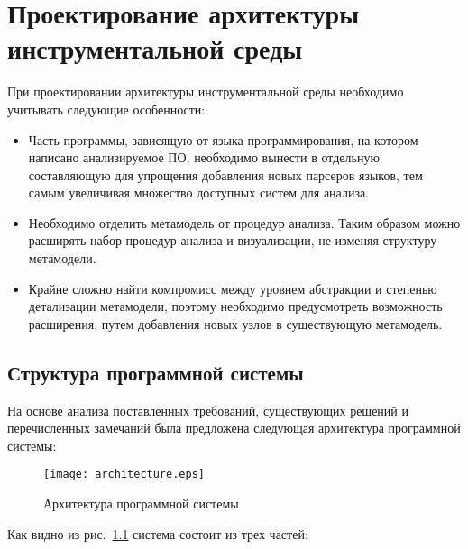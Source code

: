 \chapter{Проектирование архитектуры инструментальной среды}

При проектировании архитектуры инструментальной среды необходимо учитывать
следующие особенности:

\begin{itemize}
    \item Часть программы, зависящую от языка программирования, на котором
    написано анализируемое ПО, необходимо вынести в отдельную составляющую для
    упрощения добавления новых парсеров языков, тем самым увеличивая множество
    доступных систем для анализа.
    \item Необходимо отделить метамодель от процедур анализа. Таким образом
    можно расширять набор процедур анализа и визуализации, не изменяя структуру
    метамодели.
    \item Крайне сложно найти компромисс между уровнем абстракции и степенью
    детализации метамодели, поэтому необходимо предусмотреть возможность
    расширения, путем добавления новых узлов в существующую метамодель.
\end{itemize}

\section{Структура программной системы}
\label{sec:architecture}

На основе анализа поставленных требований, существующих решений и перечисленных
замечаний была предложена следующая архитектура программной системы:

\begin{figure}[th]
    \begin{center}
        \texttt{[image: architecture.eps]}
    \end{center}
    \caption{Архитектура программной системы}
    \label{fig:architecture}
\end{figure}

Как видно из рис.~\ref{fig:architecture} система состоит из трех частей:

